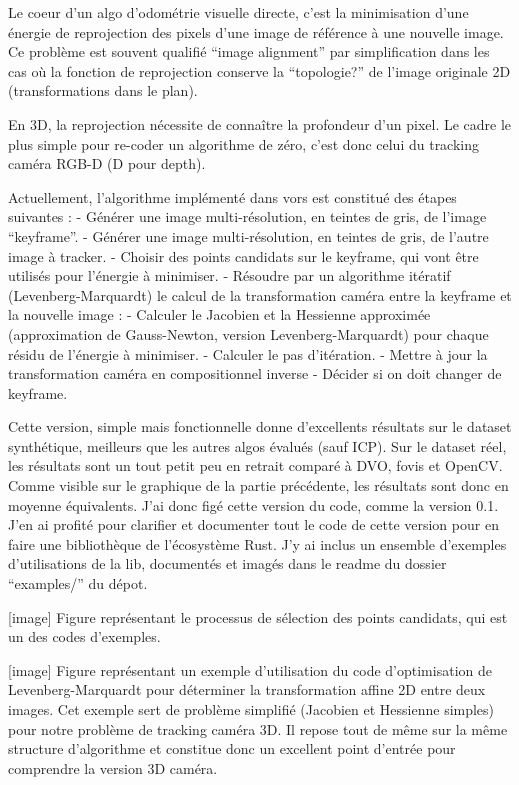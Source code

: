 Le coeur d’un algo d’odométrie visuelle directe, c’est la minimisation d’une énergie de reprojection des pixels d’une image de référence à une nouvelle image. Ce problème est souvent qualifié “image alignment” par simplification dans les cas où la fonction de reprojection conserve la “topologie?” de l’image originale 2D (transformations dans le plan).

En 3D, la reprojection nécessite de connaître la profondeur d’un pixel. Le cadre le plus simple pour re-coder un algorithme de zéro, c’est donc celui du tracking caméra RGB-D (D pour depth).

Actuellement, l’algorithme implémenté dans vors est constitué des étapes suivantes :
- Générer une image multi-résolution, en teintes de gris, de l’image “keyframe”.
- Générer une image multi-résolution, en teintes de gris, de l’autre image à tracker.
- Choisir des points candidats sur le keyframe, qui vont être utilisés pour l’énergie à minimiser.
- Résoudre par un algorithme itératif (Levenberg-Marquardt) le calcul de la transformation caméra entre la keyframe et la nouvelle image :
  - Calculer le Jacobien et la Hessienne approximée (approximation de Gauss-Newton, version Levenberg-Marquardt) pour chaque résidu de l’énergie à minimiser.
  - Calculer le pas d’itération.
  - Mettre à jour la transformation caméra en compositionnel inverse
- Décider si on doit changer de keyframe.

Cette version, simple mais fonctionnelle donne d’excellents résultats sur le dataset synthétique, meilleurs que les autres algos évalués (sauf ICP). Sur le dataset réel, les résultats sont un tout petit peu en retrait comparé à DVO, fovis et OpenCV. Comme visible sur le graphique de la partie précédente, les résultats sont donc en moyenne équivalents. J’ai donc figé cette version du code, comme la version 0.1. J’en ai profité pour clarifier et documenter tout le code de cette version pour en faire une bibliothèque de l’écosystème Rust. J’y ai inclus un ensemble d’exemples d’utilisations de la lib, documentés et imagés dans le readme du dossier “examples/” du dépot.

[image] Figure représentant le processus de sélection des points candidats, qui est un des codes d’exemples.

[image] Figure représentant un exemple d’utilisation du code d’optimisation de Levenberg-Marquardt pour déterminer la transformation affine 2D entre deux images. Cet exemple sert de problème simplifié (Jacobien et Hessienne simples) pour notre problème de tracking caméra 3D. Il repose tout de même sur la même structure d’algorithme et constitue donc un excellent point d’entrée pour comprendre la version 3D caméra.

